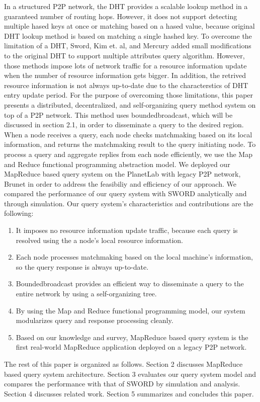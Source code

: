 \documentclass{acm_proc_article-sp}
\begin{document}
In a structured P2P network, the DHT provides a scalable lookup method in a guaranteed number of routing hops. 
However, it does not support detecting multiple hased keys at once or matching based on a hased value, because original DHT lookup method is based on matching a single hashed key.
To overcome the limitation of a DHT, Sword\cite{sword}, Kim et. al\cite{can_query}, and Mercury\cite{mercury} added small modifications to the original DHT to support multiple attributes query algorithm.
However, those methods impose lots of network traffic for a resource information update when the number of resource information gets bigger. 
In addition, the retrived resource information is not always up-to-date due to the characterstics of DHT entry update period.
For the purpose of overcoming those limitations, this paper presents a distributed, decentralized, and self-organizing query method system on top of a P2P network. 
This method uses boundedbroadcast, which will be discussed in section 2.1, in order to disseminate a query to the desired region.
When a node receives a query, each node checks matchmaking based on its local information, and returns the matchmaking result to the query initiating node.
To process a query and aggregate replies from each node efficiently, we use the Map and Reduce functional programming abstraction model.
We deployed our MapReduce based query system on the PlanetLab\cite{planetlab} with legacy P2P network, Brunet\cite{brunet} in order to address the feasibiliy and efficiency of our approach. 
We compared the performance of our query system with SWORD\cite{sword} analytically and through simulation.
Our query system's characteristics and contributions are the following:
\begin{enumerate}
\setlength{\itemsep}{0pt}
\setlength{\parskip}{0pt}
\item It imposes no resource information update traffic, because each query is resolved using the a node's local resource information.
\item Each node processes matchmaking based on the local machine's information, so the query response is always up-to-date.
\item Boundedbroadcast provides an efficient way to disseminate a query to the entire network by using a self-organizing tree.
\item By using the Map and Reduce functional programming model, our system modularizes query and response processing cleanly.
\item Based on our knowledge and survey, MapReduce based query system is the first real-world MapReduce application deployed on a legacy P2P network.
\end{enumerate}
The rest of this paper is organized as follows. 
Section 2 discusses MapReduce based query system architecture. 
Section 3 evaluates our query system model and compares the performance with that of SWORD by simulation and analysis. Section 4 discusses related work.
Section 5 summarizes and concludes this paper.
\end{document}
